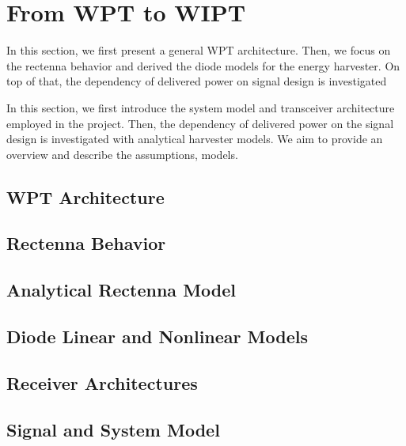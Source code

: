 \chapter{From WPT to WIPT}
In this section, we first present a general WPT architecture. Then, we focus on the rectenna behavior and derived the diode models for the energy harvester. On top of that, the dependency of delivered power on signal design is investigated

In this section, we first introduce the system model and transceiver architecture employed in the project. Then, the dependency of delivered power on the signal design is investigated with analytical harvester models. We aim to provide an overview and describe the assumptions, models.

\section{WPT Architecture}
  

\section{Rectenna Behavior}
  

\section{Analytical Rectenna Model}\label{sec:analytical-rectenna-model}
  

\section{Diode Linear and Nonlinear Models}
  

\section{Receiver Architectures}
  

\section{Signal and System Model}
  
